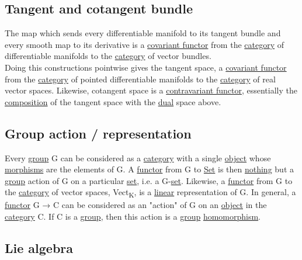 \documentclass[11pt]{article}
\begin{document}
\subsection{\label{orgb91af69}Tangent and cotangent bundle}
\label{sec:org9f4e096}

The map which sends every differentiable manifold to its tangent bundle and every smooth map to its derivative is a \hyperref[orgdf09291]{covariant functor} from the \hyperref[org3e3a79b]{category} of differentiable manifolds to the \hyperref[org3e3a79b]{category} of vector bundles.\\

Doing this constructions pointwise gives the tangent space, a \hyperref[orgdf09291]{covariant functor} from the \hyperref[org3e3a79b]{category} of pointed differentiable manifolds to the \hyperref[org3e3a79b]{category} of real vector spaces. Likewise, cotangent space is a \hyperref[org4f18281]{contravariant functor}, essentially the \hyperref[org24a8abd]{composition} of the tangent space with the \hyperref[org0a6da4c]{dual} space above.\\

\subsection{\label{org4bac153}Group action / representation}
\label{sec:org75774aa}

Every \hyperref[org9ef38ed]{group} G can be considered as a \hyperref[org3e3a79b]{category} with a single \hyperref[org025aac8]{object} whose \hyperref[org8ed0ce8]{morphisms} are the elements of G. A \hyperref[org6073683]{functor} from G to \hyperref[orgbed80ba]{Set} is then \hyperref[org235dcde]{nothing} but a \hyperref[org9ef38ed]{group} action of G on a particular \hyperref[orgbed80ba]{set}, i.e. a G-\hyperref[orgbed80ba]{set}. Likewise, a \hyperref[org6073683]{functor} from G to the \hyperref[org3e3a79b]{category} of vector spaces, Vect\textsubscript{K}, is a \hyperref[orgb55e183]{linear} representation of G. In general, a \hyperref[org6073683]{functor} G → C can be considered as an "action" of G on an \hyperref[org025aac8]{object} in the \hyperref[org3e3a79b]{category} C. If C is a \hyperref[org9ef38ed]{group}, then this action is a \hyperref[org9ef38ed]{group} \hyperref[org01da5b8]{homomorphism}.\\

\subsection{\label{org02864be}Lie algebra}
\label{sec:org5cf624e}
\end{document}
